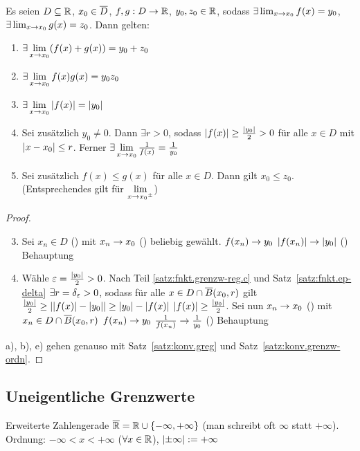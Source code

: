 \documentclass[12pt]{scrreprt}
\begin{document}
\begin{satz}\label{satz:fnkt.grenzw-reg}
Es seien $D \subseteq \mathbb{R}$, $x_0\in\overline{D}$, $f, g: D\rightarrow\mathbb{R}$, $y_0, z_0\in\mathbb{R}$, sodass $\exists \lim_{x\rightarrow x_0}f(x) = y_0$,
$\exists \lim_{x\rightarrow x_0}g(x) = z_0$. Dann gelten:
\begin{enumerate}
\item $\exists \lim\limits_{x\rightarrow x_0} (f(x) + g(x)) = y_0 + z_0$\label{satz:fnkt.grenzw-reg.a}
\item $\exists \lim\limits_{x\rightarrow x_0} f(x)g(x) = y_0z_0$\label{satz:fnkt.grenzw-reg.b}
\item $\exists \lim\limits_{x\rightarrow x_0} \left\lvert f(x)\right\lvert = \left\lvert y_0\right\lvert$\label{satz:fnkt.grenzw-reg.c}
\item Sei zusätzlich $y_0 \neq 0$. Dann $\exists r > 0$, sodass $\left\lvert f(x)\right\lvert \ge \frac{\left\lvert y_0\right\lvert}{2} > 0$ 
für alle $x\in D$ mit $\left\lvert x - x_0\right\lvert \le r$. Ferner $\exists \lim\limits_{x\rightarrow x_0} \frac{1}{f(x)} = \frac{1}{y_0}$\label{satz:fnkt.grenzw-reg.d}
\item Sei zusätzlich $f(x) \le g(x)$ für alle $x\in D$. Dann gilt $x_0 \le z_0$. (Entsprechendes gilt für $\lim\limits_{x\rightarrow {x_0}^\pm}$)\label{satz:fnkt.grenzw-reg.e}
\end{enumerate}
\end{satz}
\begin{proof}
\begin{enumerate}\setcounter{enumi}{2}
\item Sei $x_n \in D$ () mit $x_n\rightarrow x_0$ (\ninf) beliebig gewählt.  $f(x_n) \rightarrow y_0$ 
\folgtnach{\ref{satz:konv.grenzw-komplex}} $\left\lvert f(x_n)\right\lvert \rightarrow \left\lvert y_0\right\lvert$ (\ninf) \folgt Behauptung
\item Wähle $\varepsilon = \frac{\left\lvert y_0\right\lvert}{2} > 0$. Nach Teil \ref{satz:fnkt.grenzw-reg.c} und Satz~\ref{satz:fnkt.ep-delta}
$\exists r=\delta_\varepsilon > 0$, sodass für alle $x\in D\cap\overline{B}(x_0, r)$ gilt $\frac{\left\lvert y_0\right\lvert}{2} \ge \left\lvert\left\lvert f(x)\right\lvert - \left\lvert y_0\right\lvert\right\lvert \ge \left\lvert y_0\right\lvert - \left\lvert f(x)\right\lvert$
\gdw $\left\lvert f(x)\right\lvert \ge \frac{\left\lvert y_0\right\lvert}{2}$. Sei nun $x_n\rightarrow x_0$ (\ninf) mit $x_n \in D \cap \overline{B}(x_0, r)$
 $f(x_n) \rightarrow y_0$ \folgtnach{\ref{satz:konv.greg}} $\frac{1}{f(x_n)} \rightarrow \frac{1}{y_0}$ (\ninf) \folgt Behauptung
\end{enumerate}

\noindent a), b), e) gehen genauso mit Satz~\ref{satz:konv.greg} und Satz~\ref{satz:konv.grenzw-ordn}.
\end{proof}

\subsection*{Uneigentliche Grenzwerte}
\begin{dfn*}
Erweiterte Zahlengerade $\overline{\mathbb{R}} = \mathbb{R} \cup \{-\infty, +\infty\}$ (man schreibt
oft $\infty$ statt $+\infty$). Ordnung: $-\infty < x < +\infty$ ($\forall x\in\mathbb{R}$), $\left\lvert\pm\infty\right\lvert := +\infty$
\end{dfn*}
\end{document}
